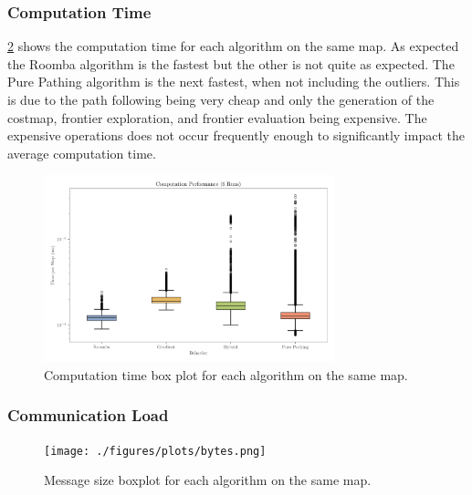 \subsubsection{Computation Time}
\cref{fig:computation-performance} shows the computation time for each algorithm on the same map. As expected the Roomba algorithm is the fastest but the other is not quite as expected.
The Pure Pathing algorithm is the next fastest, when not including the outliers. 
This is due to the path following being very cheap and only the generation of the costmap, frontier exploration, and frontier evaluation being expensive. 
The expensive operations does not occur frequently enough to significantly impact the average computation time.
\begin{figure}[H]
    \begin{center}
        \includegraphics[width=0.75\textwidth]{./figures/plots/computation-performance-(6-runs).png}
    \end{center}
    \caption{Computation time box plot for each algorithm on the same map.}
    \label{fig:computation-performance}
\end{figure}

\subsubsection{Communication {\color{red}Load}}
\begin{figure}[H]
    \begin{center}
        \texttt{[image: ./figures/plots/bytes.png]}
    \end{center}
    \caption{Message size boxplot for each algorithm on the same map.}
    \label{fig:computation-performance}
\end{figure}
